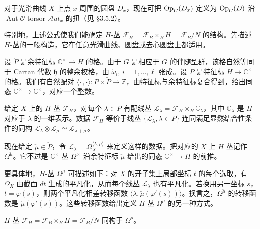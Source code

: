 对于光滑曲线 $X$ 上点 $x$ 周围的圆盘 $D_x$，现在可把 $\operatorname{Op}_G(D_x)$ 定义为 $\operatorname{Op}_G(D)$ 沿 $\operatorname{Aut}\mathcal{O}$-torsor $\mathcal{A}ut_x$ 的扭（见 §3.5.2）。

特别地，上述公式使我们能确定 $H$-丛 $\mathcal{F}_H=\mathcal{F}_B\times_B H=\mathcal{F}_B/N$ 的结构。先描述 $H$-丛的一般构造，它在任意光滑曲线、圆盘或去心圆盘上都适用。

设 $\check{P}$ 是余特征标 $\mathbb{C}^\times\to H$ 的格。由于 $G$ 是相应于 $G$ 的伴随型群，该格自然等同于 Cartan 代数 $\mathfrak{h}$ 的整余权格，由 $\check{\omega}_i,\,i=1,\dots,\ell$ 张成。设 $P$ 是特征标 $H\to\mathbb{C}^\times$ 的格。我们有自然配对 $\langle\cdot\,,\cdot\rangle:P\times\check{P}\to\mathbb{Z}$，由特征标与余特征标复合得到，给出同态 $\mathbb{C}^\times\to\mathbb{C}^\times$，对应一个整数。

给定 $X$ 上的 $H$-丛 $\mathcal{F}_H$，对每个 $\lambda\in P$ 有配线丛 $\mathcal{L}_\lambda=\mathcal{F}_H\times_H\mathbb{C}_\lambda$，其中 $\mathbb{C}_\lambda$ 是 $H$ 对应于 $\lambda$ 的一维表示。数据 $\mathcal{F}_H$ 等价于线丛 $\{\mathcal{L}_\lambda,\lambda\in P\}$ 连同满足显然结合性条件的同构 $\mathcal{L}_\lambda\otimes\mathcal{L}_\mu\simeq\mathcal{L}_{\lambda+\mu}$。


现在给定 $\check{\mu}\in\check{P}$，令 $\mathcal{L}_\lambda=\Omega_X^{\langle\lambda,\check{\mu}\rangle}$ 来定义这样的数据。把对应的 $X$ 上 $H$-丛记作 $\Omega^{\check{\mu}}$。它不过是 $\mathbb{C}^\times$-丛 $\Omega^\times$ 沿余特征标 $\check{\mu}$ 给出的同态 $\mathbb{C}^\times\to H$ 的前推。

更具体地，$H$-丛 $\Omega^{\check{\mu}}$ 可描述如下：对 $X$ 的开子集上局部坐标 $t$ 的每个选取，有 $\Omega_X$ 由截面 $dt$ 生成的平凡化，从而每个线丛 $\mathcal{L}_\lambda$ 也有平凡化。若换用另一坐标 $s$，$t=\varphi(s)$，则两个平凡化相差转移函数 $\langle\lambda,\check{\mu}(\varphi'(s))\rangle$。换言之，$\Omega^{\check{\mu}}$ 的转移函数是 $\check{\mu}(\varphi'(s))$。这些转移函数给出定义 $H$-丛 $\Omega^{\check{\mu}}$ 的另一种方式。

\begin{lemma}
    $H$-丛 $\mathcal{F}_H=\mathcal{F}_B\times_B H=\mathcal{F}_B/N$ 同构于 $\Omega^{\check{\rho}}$。
\end{lemma}

